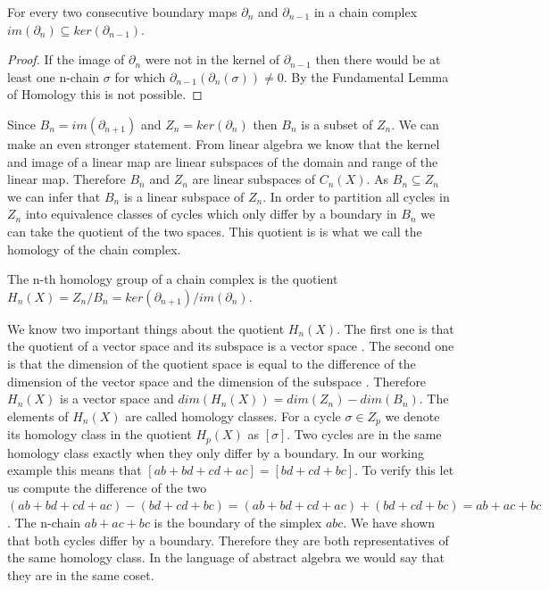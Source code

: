 \begin{cor}  For every two consecutive boundary maps $\partial_n$ and $\partial_{n-1}$ in a chain complex $im(\partial_n) \subseteq ker(\partial_{n-1})$. \end{cor}

\begin{proof}
    If the image of $\partial_n$ were not in the kernel of $\partial_{n-1}$ then there would be at least one n-chain $\sigma$ for which $\partial_{n-1}(\partial_n(\sigma)) \ne 0$. By the Fundamental Lemma of Homology this is not possible.
\end{proof}



Since $B_n = im(\partial_{n+1})$ and $Z_n = ker(\partial_n)$ then $B_n$ is a subset of $Z_n$. We can make an even stronger statement. From linear algebra \cite{lin-alg-done-right} we know that the kernel and image of a linear map are linear subspaces of the domain and range of the linear map. Therefore $B_n$ and $Z_n$ are linear subspaces of $C_n(X)$. As $B_n \subseteq Z_n$ we can infer that $B_n$ is a linear subspace of $Z_n$. In order to partition all cycles in $Z_n$ into equivalence classes of cycles which only differ by a boundary in $B_n$ we can take the quotient of the two spaces. This quotient is is what we call the homology of the chain complex.

\begin{defn} The n-th homology group of a chain complex is the quotient $H_n(X) = Z_n \big/ B_n = ker(\partial_{n+1})\big/im(\partial_n)$. \end{defn}

We know two important things about the quotient $H_n(X)$. The first one is that the quotient of a vector space and its subspace is a vector space \cite{lin-alg-done-right}. The second one is that the dimension of the quotient space is equal to the difference of the dimension of the vector space and the dimension of the subspace \cite{lin-alg-done-right}. Therefore $H_n(X)$ is a vector space and $dim(H_n(X)) = dim(Z_n) - dim(B_n)$. The elements of $H_n(X)$ are called homology classes. For a cycle $\sigma \in Z_p$ we denote its homology class in the quotient $H_p(X)$ as $[\sigma]$. Two cycles are in the same homology class exactly when they only differ by a boundary. In our working example this means that $[ab + bd + cd + ac] = [bd + cd + bc]$. To verify this let us compute the difference of the two $(ab + bd + cd + ac) - (bd + cd + bc) = (ab + bd + cd + ac) + (bd + cd + bc) = ab + ac + bc$. The n-chain $ab + ac + bc$ is the boundary of the simplex
$abc$. We have shown that both cycles differ by a boundary. Therefore they are both representatives of the same homology class. In the language of abstract algebra we would say that they are in the same coset.

